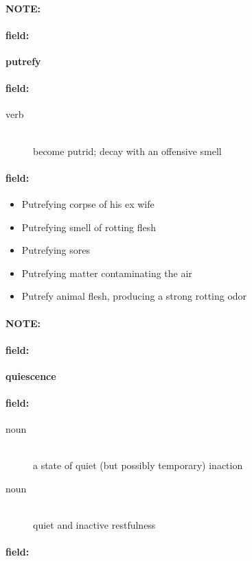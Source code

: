 \documentclass[12pt]{article}
\newenvironment{note}{\paragraph{NOTE:}}{}
\newenvironment{field}{\paragraph{field:}}{}
\begin{document}
\begin{note}
\begin{field}
\textbf{\large putrefy}
\end{field}


\begin{field}
\begin{description}
\item[verb] \hfill \\ 
become putrid; decay with an offensive smell

\end{description}
\end{field}

\begin{field}
\begin{itemize}
\item Putrefying corpse of his ex wife
\item Putrefying smell of rotting flesh
\item Putrefying sores
\item Putrefying matter contaminating the air
\item Putrefy animal flesh, producing a strong rotting odor
\end{itemize}
\end{field}
\end{note}
\begin{note}
\begin{field}
\textbf{\large quiescence}
\end{field}


\begin{field}
\begin{description}
\item[noun] \hfill \\ 
a state of quiet (but possibly temporary) inaction

\item[noun] \hfill \\ 
quiet and inactive restfulness

\end{description}
\end{field}

\begin{field}
\end{field}
\end{note}
\end{document}
